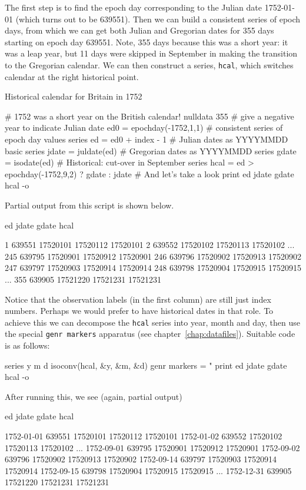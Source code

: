 The first step is to find the epoch day corresponding to the Julian
date 1752-01-01 (which turns out to be 639551). Then we can build a
consistent series of epoch days, from which we can get both Julian and
Gregorian dates for 355 days starting on epoch day 639551. Note, 355
days because this was a short year: it was a leap year, but 11 days
were skipped in September in making the transition to the Gregorian
calendar. We can then construct a series, \texttt{hcal}, which
switches calendar at the right historical point.


\begin{script}[htbp]
  \caption{Historical calendar for Britain in 1752}
  \label{ex:britain-1752}
\begin{scode}
# 1752 was a short year on the British calendar!
nulldata 355
# give a negative year to indicate Julian date
ed0 = epochday(-1752,1,1)
# consistent series of epoch day values
series ed = ed0 + index - 1
# Julian dates as YYYYMMDD basic
series jdate = juldate(ed)
# Gregorian dates as YYYYMMDD
series gdate = isodate(ed)
# Historical: cut-over in September
series hcal = ed > epochday(-1752,9,2) ? gdate : jdate
# And let's take a look
print ed jdate gdate hcal -o
\end{scode}
\end{script}

Partial output from this script is shown below.
%
\begin{code}
              ed        jdate        gdate         hcal

  1       639551     17520101     17520112     17520101
  2       639552     17520102     17520113     17520102
...
245       639795     17520901     17520912     17520901
246       639796     17520902     17520913     17520902
247       639797     17520903     17520914     17520914
248       639798     17520904     17520915     17520915
...
355       639905     17521220     17521231     17521231
\end{code}

Notice that the observation labels (in the first column) are still
just index numbers. Perhaps we would prefer to have historical dates
in that role. To achieve this we can decompose the \texttt{hcal}
series into year, month and day, then use the special \texttt{genr
  markers} apparatus (see chapter~\ref{chap:datafiles}). Suitable
code is as follows:
\begin{code}
series y m d
isoconv(hcal, &y, &m, &d)
genr markers = "%
print ed jdate gdate hcal -o
\end{code}

After running this, we see (again, partial output)
%
\begin{code}
                     ed        jdate        gdate         hcal

1752-01-01       639551     17520101     17520112     17520101
1752-01-02       639552     17520102     17520113     17520102
...
1752-09-01       639795     17520901     17520912     17520901
1752-09-02       639796     17520902     17520913     17520902
1752-09-14       639797     17520903     17520914     17520914
1752-09-15       639798     17520904     17520915     17520915
...
1752-12-31       639905     17521220     17521231     17521231
\end{code}
